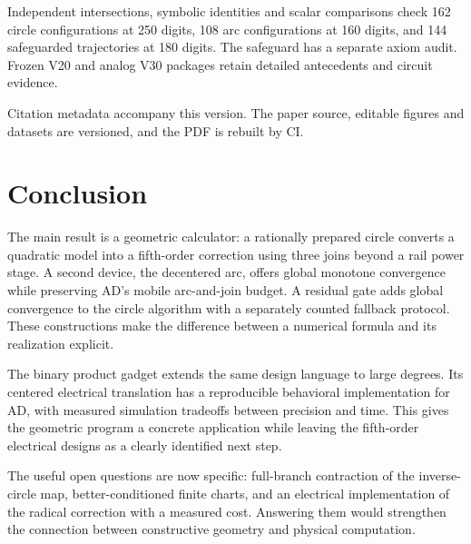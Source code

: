 \documentclass[11pt,a4paper]{article}
\begin{document}
Independent intersections, symbolic identities and scalar comparisons check 162 circle configurations at 250 digits, 108 arc configurations at 160 digits, and 144 safeguarded trajectories at 180 digits. The safeguard has a separate axiom audit. Frozen V20 and analog V30 packages retain detailed antecedents and circuit evidence.

Citation metadata accompany this version. The paper source, editable figures and datasets are versioned, and the PDF is rebuilt by CI.

\section{Conclusion}
The main result is a geometric calculator: a rationally prepared circle converts a quadratic model into a fifth-order correction using three joins beyond a rail power stage. A second device, the decentered arc, offers global monotone convergence while preserving AD's mobile arc-and-join budget. A residual gate adds global convergence to the circle algorithm with a separately counted fallback protocol. These constructions make the difference between a numerical formula and its realization explicit.

The binary product gadget extends the same design language to large degrees. Its centered electrical translation has a reproducible behavioral implementation for AD, with measured simulation tradeoffs between precision and time. This gives the geometric program a concrete application while leaving the fifth-order electrical designs as a clearly identified next step.

The useful open questions are now specific: full-branch contraction of the inverse-circle map, better-conditioned finite charts, and an electrical implementation of the radical correction with a measured cost. Answering them would strengthen the connection between constructive geometry and physical computation.

\appendix
\end{document}
